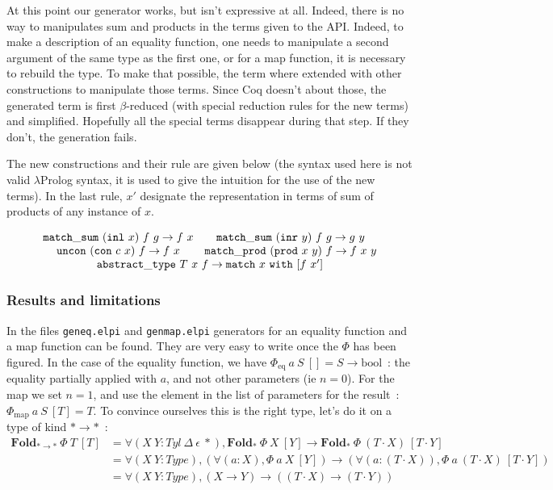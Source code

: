 \documentclass{article}
\newcommand{\fld}{\mathbf{Fold}}
\begin{document}
At this point our generator works, but isn't expressive at all. Indeed, there
is no way to manipulates sum and products in the terms given to the API. Indeed,
to make a description of an equality function, one needs to manipulate a
second argument of the same type as the first one, or for a map function,
it is necessary to rebuild the type. To make that possible, the term where
extended with other constructions to manipulate those terms. Since Coq doesn't
about those, the generated term is first $\beta$-reduced (with special reduction
rules for the new terms) and simplified. Hopefully all the special terms
disappear during that step. If they don't, the generation fails.

The new constructions and their rule are given below (the syntax used here is not valid
$\lambda$Prolog syntax, it is used to give the intuition for the use of the
new terms). In the last rule, $x'$ designate the representation in terms of
sum of products of any instance of $x$.

\[\begin{array}{cc}
      \mathtt{match\_sum}\ (\mathtt{inl}\ x)\ f\ g\rightarrow f\ x
    & \mathtt{match\_sum}\ (\mathtt{inr}\ y)\ f\ g\rightarrow g\ y
    \\
      \mathtt{uncon}\ (\mathtt{con}\ c\ x)\ f \rightarrow f\ x
    & \mathtt{match\_prod}\ (\mathtt{prod}\ x\ y)\ f \rightarrow f\ x\ y
    \\
    \multicolumn{2}{c}{
        \mathtt{abstract\_type}\ T\ x\ f\rightarrow \mathtt{match}\ x\ \mathtt{with}\ [f\ x']
    } \\
\end{array}\]

\subsubsection{Results and limitations}

In the files \texttt{geneq.elpi} and \texttt{genmap.elpi} generators for an
equality function and a map function can be found. They are very easy to write
once the $\Phi$ has been figured. In the case of the equality function, we
have $\Phi_{\text{eq}}\ a\ S\ [] = S \rightarrow \text{bool}$~: the
equality partially applied with $a$, and not other parameters (ie $n = 0$). For
the map we set $n = 1$, and use the element in the list of parameters for the
result~: $\Phi_{\text{map}}\ a\ S\ [T] = T$. To convince ourselves this is the
right type, let's do it on a type of kind $*\rightarrow *$~:
\begin{align*}
    \fld_{*\rightarrow *}\ \Phi\ T\ [T]
        &= \forall (X\ Y : Tyl\ \Delta\ \epsilon\ *), \fld_*\ \Phi\ X\ [Y]
            \rightarrow \fld_*\ \Phi\ (T\cdot X)\ [T\cdot Y] \\
        &= \forall (X\ Y : Type), (\forall (a : X), \Phi\ a\ X\ [Y])
            \rightarrow (\forall (a : (T\cdot X)), \Phi\ a\ (T\cdot X)\ [T\cdot Y]) \\
        &= \forall (X\ Y : Type), (X \rightarrow Y) \rightarrow ((T\cdot X)\rightarrow(T\cdot Y)) \\
\end{align*}
\end{document}
